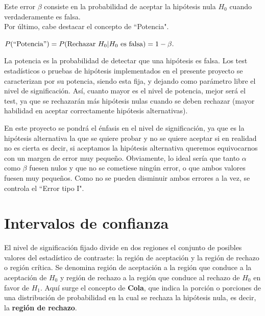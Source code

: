 Este error $\beta$ consiste en la probabilidad de aceptar la hipótesis nula $H_0$ cuando verdaderamente es
falsa.
\\Por último, cabe destacar el concepto de ``Potencia".
\begin{center}
$P(\mbox{``Potencia}") = P(\mbox{Rechazar } H_0|H_0 \mbox{ es falsa}) =1-\beta.$
\end{center}
La potencia es la probabilidad de detectar que una hipótesis es falsa. Los test estadísticos o pruebas de hipótesis
implementados en el presente proyecto se caracterizan por su potencia, siendo esta fija, y dejando como parámetro
libre el nivel de significación. Así, cuanto mayor es el nivel de potencia, mejor será el test, ya que se rechazarán
más hipótesis nulas cuando se deben rechazar (mayor habilidad en aceptar correctamente hipótesis alternativas).

En este proyecto se pondrá el énfasis en el nivel de significación, ya que es la hipótesis alternativa la que se
quiere probar y no se quiere aceptar si en realidad no es cierta es decir, si aceptamos la hipótesis alternativa
queremos equivocarnos con un margen de error muy pequeño. Obviamente, lo ideal sería que tanto $\alpha$ como
$\beta$ fuesen nulos y que no se cometiese ningún error, o que ambos valores fuesen muy pequeños. Como no se pueden
disminuir ambos errores a la vez, se controla el ``Error tipo I".


\section{Intervalos de confianza}
El nivel de significación fijado divide en dos regiones el conjunto de posibles valores del estadístico de
contraste: la región de aceptación y la región de rechazo o región crítica. Se denomina región de aceptación
a la región que conduce a la aceptación de $H_0$ y región de rechazo a la región que conduce al rechazo de $H_0$
en favor de $H_1$. Aquí surge el concepto de \textbf{Cola}, que indica la porción o porciones de una distribución
de probabilidad en la cual se rechaza la hipótesis nula, es decir, la \textbf{región de rechazo}.

